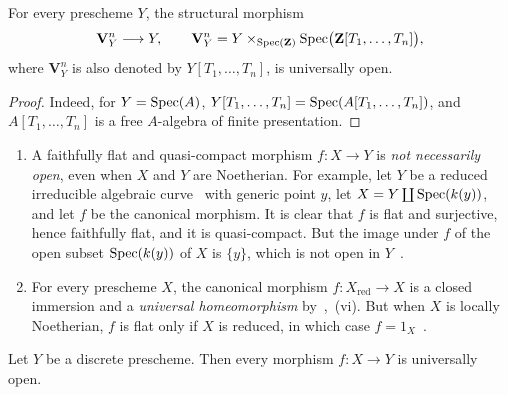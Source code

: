 \begin{corollary}[2.4.7]
\label{IV.2.4.7}
For every prescheme $Y$, the structural morphism
\[
  \mathbf{V}_Y^n\longrightarrow Y,
  \qquad
  \mathbf{V}_Y^n
  =Y\times_{\operatorname{Spec}(\mathbf{Z})}\operatorname{Spec}\bigl(\mathbf{Z}[T_1,\ldots,T_n]\bigr),
\]
where $\mathbf{V}_Y^n$ is also denoted by $Y[T_1,\ldots,T_n]$, is universally open.
\end{corollary}

\begin{proof}
Indeed, for $Y=\operatorname{Spec}(A)$, $Y[T_1,\ldots,T_n]=\operatorname{Spec}(A[T_1,\ldots,T_n])$, and $A[T_1,\ldots,T_n]$ is a free $A$-algebra of finite presentation.
\end{proof}

\begin{remark}[2.4.8]
\label{IV.2.4.8}
\medskip\noindent
\begin{enumerate}
  \item[(i)] A faithfully flat and quasi-compact morphism $f:X\to Y$ is \emph{not necessarily open}, even when $X$ and $Y$ are Noetherian.
    For example, let $Y$ be a reduced irreducible algebraic curve~ with generic point $y$, let $X=Y\coprod\operatorname{Spec}(k(y))$, and let $f$ be the canonical morphism. It is clear that $f$ is flat and surjective, hence faithfully flat, and it is quasi-compact. But the image under $f$ of the open subset $\operatorname{Spec}(k(y))$ of $X$ is $\{y\}$, which is not open in $Y$~.
  \item[(ii)] For every prescheme $X$, the canonical morphism $f:X_{\mathrm{red}}\to X$ is a closed immersion and a \emph{universal homeomorphism} by~,~(vi). But when $X$ is locally Noetherian, $f$ is flat only if $X$ is reduced, in which case $f=1_X$~.
\end{enumerate}
\end{remark}

\begin{proposition}[2.4.9]
\label{IV.2.4.9}
Let $Y$ be a discrete prescheme. Then every morphism $f:X\to Y$ is universally open.
\end{proposition}


